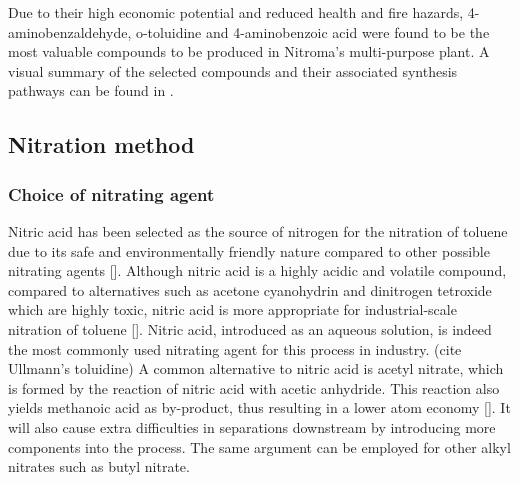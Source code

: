 Due to their high economic potential and reduced health and fire hazards, 4-aminobenzaldehyde, o-toluidine and 4-aminobenzoic acid were found to be the most valuable compounds to be produced in Nitroma's multi-purpose plant.  A visual summary of the selected compounds and their associated synthesis pathways can be found in .



\subsection{Nitration method}
\subsubsection{Choice of nitrating agent}
Nitric acid has been selected as the source of nitrogen for the nitration of toluene due to its safe and environmentally friendly nature compared to other possible nitrating agents []. Although nitric acid is a highly acidic and volatile compound, compared to alternatives such as acetone cyanohydrin and dinitrogen tetroxide which are highly toxic, nitric acid is more appropriate for industrial-scale nitration of toluene []. Nitric acid, introduced as an aqueous solution, is indeed the most commonly used nitrating agent for this process in industry. (cite Ullmann's toluidine) A common alternative to nitric acid is acetyl nitrate, which is formed by the reaction of nitric acid with acetic anhydride. This reaction also yields methanoic acid as by-product, thus resulting in a lower atom economy []. It will also cause extra difficulties in separations downstream by introducing more components into the process. The same argument can be employed for other alkyl nitrates such as butyl nitrate. 



